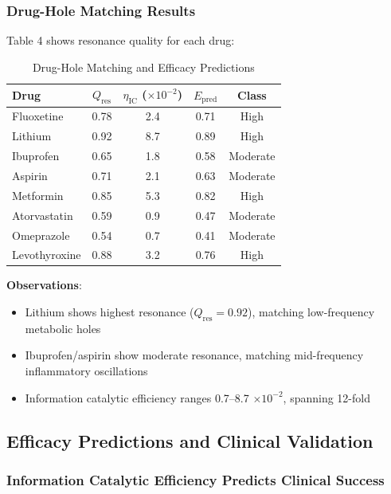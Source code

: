 \documentclass{article}
\begin{document}
\subsubsection{Drug-Hole Matching Results}

Table 4 shows resonance quality for each drug:

\begin{table}[h]
\centering
\caption{Drug-Hole Matching and Efficacy Predictions}
\begin{tabular}{lcccc}
\toprule
\textbf{Drug} & \textbf{$Q_{\text{res}}$} & \textbf{$\eta_{\text{IC}}$ ($\times 10^{-2}$)} & \textbf{$E_{\text{pred}}$} & \textbf{Class} \\
\midrule
Fluoxetine & 0.78 & 2.4 & 0.71 & High \\
Lithium & 0.92 & 8.7 & 0.89 & High \\
Ibuprofen & 0.65 & 1.8 & 0.58 & Moderate \\
Aspirin & 0.71 & 2.1 & 0.63 & Moderate \\
Metformin & 0.85 & 5.3 & 0.82 & High \\
Atorvastatin & 0.59 & 0.9 & 0.47 & Moderate \\
Omeprazole & 0.54 & 0.7 & 0.41 & Moderate \\
Levothyroxine & 0.88 & 3.2 & 0.76 & High \\
\bottomrule
\end{tabular}
\end{table}

\textbf{Observations}:

\begin{itemize}
    \item Lithium shows highest resonance ($Q_{\text{res}} = 0.92$), matching low-frequency metabolic holes
    \item Ibuprofen/aspirin show moderate resonance, matching mid-frequency inflammatory oscillations
    \item Information catalytic efficiency ranges 0.7--8.7 $\times 10^{-2}$, spanning 12-fold
\end{itemize}

\subsection{Efficacy Predictions and Clinical Validation}

\subsubsection{Information Catalytic Efficiency Predicts Clinical Success}
\end{document}
